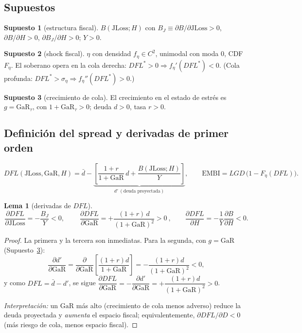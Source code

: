 \documentclass[11pt]{article}
\theoremstyle{plain}
\newtheorem{lemma}{Lema}
\theoremstyle{definition}
\newtheorem{assumption}{Supuesto}
\newcommand{\JLoss}{\mathrm{JLoss}}
\newcommand{\EMBI}{\mathrm{EMBI}}
\newcommand{\GaR}{\mathrm{GaR}}
\newcommand{\1}{\mathbf{1}}
\begin{document}
\subsection{Supuestos}
\begin{assumption}[estructura fiscal]\label{as:B}
$B(\JLoss;H)$ con $B_J\equiv\partial B/\partial\JLoss>0$, $\partial B/\partial H>0$, $\partial B_J/\partial H>0$; $Y>0$.
\end{assumption}
\begin{assumption}[shock fiscal]\label{as:eta}
$\eta$ con densidad $f_\eta\in C^2$, unimodal con moda $0$, CDF $F_\eta$. El soberano opera en la cola derecha: $DFL^*>0\Rightarrow f_\eta'(DFL^*)<0$. (Cola profunda: $DFL^*>\sigma_\eta\Rightarrow f_\eta''(DFL^*)>0$.)
\end{assumption}
\begin{assumption}[crecimiento de cola]\label{as:g}
El crecimiento en el estado de estrés es $g=\GaR_\tau$, con $1+\GaR_\tau>0$; deuda $d>0$, tasa $r>0$.
\end{assumption}

\subsection{Definición del spread y derivadas de primer orden}
\begin{equation}
DFL(\JLoss,\GaR,H)=\bar d-\underbrace{\left[\frac{1+r}{1+\GaR}\,d+\frac{B(\JLoss;H)}{Y}\right]}_{d'\ (\text{deuda proyectada})},\qquad
\EMBI=LGD\,\big(1-F_\eta(DFL)\big).
\label{eq:embi}
\end{equation}

\begin{lemma}[derivadas de $DFL$]\label{lem:dfl}
\[
\frac{\partial DFL}{\partial \JLoss}=-\frac{B_J}{Y}<0,\qquad
\boxed{\ \frac{\partial DFL}{\partial \GaR}=+\frac{(1+r)\,d}{(1+\GaR)^2}>0\ },\qquad
\frac{\partial DFL}{\partial H}=-\frac{1}{Y}\frac{\partial B}{\partial H}<0.
\]
\end{lemma}
\begin{proof}
La primera y la tercera son inmediatas. Para la segunda, con $g=\GaR$ (Supuesto~\ref{as:g}):
\[
\frac{\partial d'}{\partial \GaR}=\frac{\partial}{\partial \GaR}\!\left[\frac{(1+r)d}{1+\GaR}\right]=-\frac{(1+r)d}{(1+\GaR)^2}<0,
\]
y como $DFL=\bar d-d'$, se sigue $\dfrac{\partial DFL}{\partial\GaR}=-\dfrac{\partial d'}{\partial\GaR}=+\dfrac{(1+r)d}{(1+\GaR)^2}>0$.

\noindent\emph{Interpretación:} un $\GaR$ más alto (crecimiento de cola menos adverso) reduce la deuda proyectada y \emph{aumenta} el espacio fiscal; equivalentemente, $\partial DFL/\partial D<0$ (más riesgo de cola, menos espacio fiscal).
\end{proof}
\end{document}
